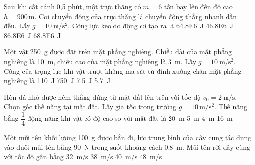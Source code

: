 \begin{ex}
	Sau khi cất cánh 0,5 phút, một trực thăng có $m=6$ tấn bay lên đến độ cao $h=\SI{900}{\meter}$. Coi chuyển động của trực thăng là chuyển động thẳng nhanh dần đều. Lấy $g=\SI{10}{\meter/\second^2}$. Công lực kéo do động cơ tạo ra là
	\choice
	{\True \SI{64.8E6}{\joule}}
	{\SI{46.8E6}{\joule}}
	{\SI{86.8E6}{\joule}}
	{\SI{68.8E6}{\joule}}
	\loigiai{}
\end{ex}
\begin{ex}
	Một vật \SI{250}{\gram} được đặt trên mặt phẳng nghiêng. Chiều dài của mặt phẳng nghiêng là \SI{10}{\meter}, chiều cao của mặt phẳng nghiêng là \SI{3}{\meter}. Lấy $g=\SI{10}{\meter/\second^2}$. Công của trọng lực khi vật trượt không ma sát từ đỉnh xuống chân mặt phẳng nghiêng là
	\choice
	{\SI{110}{\joule}}
	{\SI{750}{\joule}}
	{\True \SI{7.5}{\joule}}
	{\SI{5.7}{\joule}}
	\loigiai{}
\end{ex}
\begin{ex}
	Hòn đá nhỏ được ném thẳng đứng từ mặt đất lên trên với tốc độ $v_0=\SI{2}{\meter/\second}$. Chọn gốc thế năng tại mặt đất. Lấy gia tốc trọng trường $g=\SI{10}{\meter/\second^2}$. Thế năng bằng $\dfrac{1}{4}$ động năng khi vật có độ cao so với mặt đất là
	\choice
	{\SI{20}{\meter}}
	{\SI{5}{\meter}}
	{\SI{4}{\meter}}
	{\True \SI{16}{\meter}}
	\loigiai{}
\end{ex}
\begin{ex}
	Một mũi tên khối lượng \SI{100}{\gram} được bắn đi, lực trung bình của dây cung tác dụng vào đuôi mũi tên bằng \SI{90}{\newton} trong suốt khoảng cách \SI{0.8}{\meter}. Mũi tên rời dây cùng với tốc độ gần bằng
	\choice
	{\SI{32}{\meter/\second}}
	{\True \SI{38}{\meter/\second}}
	{\SI{40}{\meter/\second}}
	{\SI{48}{\meter/\second}}
	\loigiai{}
\end{ex}
